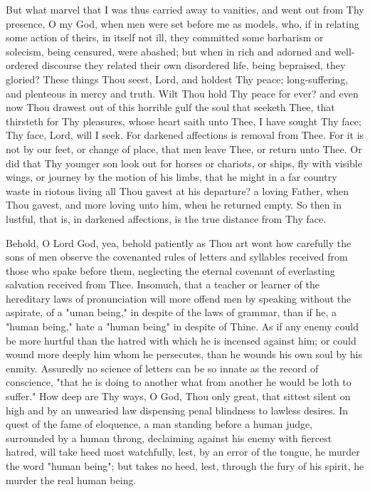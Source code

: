 \documentclass[b5paper,openright,12pt,twoside]{book}
\begin{document}
But what marvel that I was thus carried away to vanities, and went out
from Thy presence, O my God, when men were set before me as models, who,
if in relating some action of theirs, in itself not ill, they committed
some barbarism or solecism, being censured, were abashed; but when
in rich and adorned and well-ordered discourse they related their own
disordered life, being bepraised, they gloried? These things Thou seest,
Lord, and holdest Thy peace; long-suffering, and plenteous in mercy and
truth. Wilt Thou hold Thy peace for ever? and even now Thou drawest out
of this horrible gulf the soul that seeketh Thee, that thirsteth for
Thy pleasures, whose heart saith unto Thee, I have sought Thy face; Thy
face, Lord, will I seek. For darkened affections is removal from Thee.
For it is not by our feet, or change of place, that men leave Thee, or
return unto Thee. Or did that Thy younger son look out for horses or
chariots, or ships, fly with visible wings, or journey by the motion of
his limbs, that he might in a far country waste in riotous living all
Thou gavest at his departure? a loving Father, when Thou gavest, and
more loving unto him, when he returned empty. So then in lustful, that
is, in darkened affections, is the true distance from Thy face.

Behold, O Lord God, yea, behold patiently as Thou art wont how carefully
the sons of men observe the covenanted rules of letters and syllables
received from those who spake before them, neglecting the eternal
covenant of everlasting salvation received from Thee. Insomuch, that
a teacher or learner of the hereditary laws of pronunciation will more
offend men by speaking without the aspirate, of a "uman being," in
despite of the laws of grammar, than if he, a "human being," hate a
"human being" in despite of Thine. As if any enemy could be more hurtful
than the hatred with which he is incensed against him; or could wound
more deeply him whom he persecutes, than he wounds his own soul by his
enmity. Assuredly no science of letters can be so innate as the record
of conscience, "that he is doing to another what from another he would
be loth to suffer." How deep are Thy ways, O God, Thou only great,
that sittest silent on high and by an unwearied law dispensing penal
blindness to lawless desires. In quest of the fame of eloquence, a man
standing before a human judge, surrounded by a human throng, declaiming
against his enemy with fiercest hatred, will take heed most watchfully,
lest, by an error of the tongue, he murder the word "human being"; but
takes no heed, lest, through the fury of his spirit, he murder the real
human being.
\end{document}
